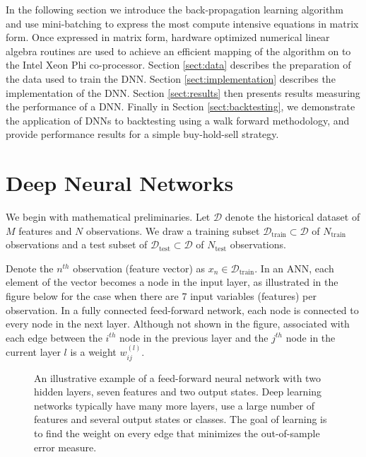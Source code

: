 \documentclass{article}
\begin{document}

In the following section we introduce the back-propagation learning algorithm and use mini-batching to express the most compute intensive equations in matrix form. Once expressed in matrix form, hardware optimized numerical linear algebra routines are used to achieve an efficient mapping of the algorithm on to the Intel Xeon Phi co-processor. Section \ref{sect:data} describes the preparation of the data used to train the DNN. Section \ref{sect:implementation} describes the implementation of the DNN. Section \ref{sect:results} then presents results measuring the performance of a DNN. Finally in Section \ref{sect:backtesting}, we demonstrate the application of DNNs to backtesting using a walk forward methodology, and provide performance results for a simple buy-hold-sell strategy.




\section{Deep Neural Networks}
We begin with mathematical preliminaries. Let $\mathcal{D}$ denote the historical dataset of $M$ features and $N$ observations.  We draw a training subset $\mathcal{D}_{\text{train}}\subset \mathcal{D}$ of $N_{\text{train}}$ observations and a test subset of $\mathcal{D}_{\text{test}}\subset \mathcal{D}$ of $N_{\text{test}}$ observations.

Denote the $n^{th}$ observation (feature vector) as $x_n\in \mathcal{D}_{\text{train}}$.  In an ANN, each element of the vector becomes a node in the input layer, as illustrated in the figure below for the case when there are 7 input variables (features) per observation. In a fully connected feed-forward network, each node is connected to every node in the next layer. Although not shown in the figure, associated with each edge between the $i^{th}$ node in the previous layer and the $j^{th}$ node in the current layer $l$ is a weight $w^{(l)}_{ij}$. 

\vspace{10pt}
\begin{figure}[h]

\caption{An illustrative example of a feed-forward neural network with two hidden layers, seven features and two output states. Deep learning networks typically have many more layers, use a large number of features and several output states or classes. The goal of learning is to find the weight on every edge that minimizes the out-of-sample error measure.}
\end{figure}
\vspace{10pt}
\end{document}
